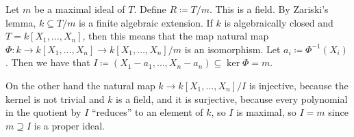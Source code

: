 Let $m$ be a maximal ideal of $T$. Define $R\coloneqq T/m$. This is a field.
By Zariski's lemma, $k \subseteq T/m$ is a finite algebraic extension. If $k$ is
algebraically closed and $T = k[X_1, \ldots, X_n]$, then this means that the map
natural map
$\Phi\colon k\to k[X_1, \ldots, X_n]\to k[X_1, \ldots, X_n]/m$ is an
isomorphism. Let $a_i\coloneqq \Phi^{-1}(X_i)$. Then we have that
$I\coloneqq (X_1-a_1, \ldots, X_n-a_n) \subseteq \ker\Phi = m$.

On the other hand the natural map  $k \to k[X_1, \ldots, X_n]/I$ is injective,
because the kernel is not trivial and $k$ is a field, and it is surjective,
because every polynomial in the quotient by $I$ \enquote{reduces} to an element
of $k$, so $I$ is maximal, so $I = m$ since $m\supseteq I$ is a proper ideal.
